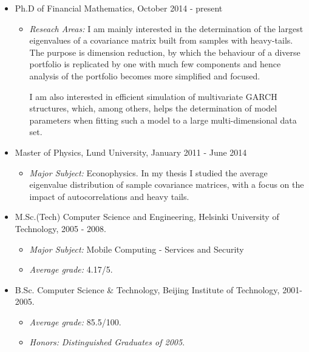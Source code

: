 \documentclass[10pt,letterpaper]{article}
\begin{document}
\begin{itemize}
\item Ph.D of Financial Mathematics, October 2014 - present
  \begin{itemize}
    \item {\it Reseach Areas:} I am mainly interested in the
      determination of the largest eigenvalues of a covariance matrix
      built from samples with heavy-tails. The purpose is dimension
      reduction, by which the behaviour of a diverse portfolio is
      replicated by one with much few components and hence analysis of
      the portfolio becomes more simplified and focused.

      I am also interested in efficient simulation of multivariate
      GARCH structures, which, among others, helps the determination of
      model parameters when fitting such a model to a large
      multi-dimensional data set.
  \end{itemize}  

\item Master of Physics, Lund University, January 2011 - June 2014
  \begin{itemize}
  \item {\it Major Subject:} Econophysics. In my thesis I studied the
    average eigenvalue distribution of sample covariance matrices,
    with a focus on the impact of autocorrelations and heavy tails.


  \end{itemize}

\item M.Sc.(Tech) Computer Science and Engineering, Helsinki
  University of Technology, 2005 - 2008.
  \begin{itemize}
  \item {\it Major Subject:} Mobile Computing - Services and Security
  \item {\it Average grade:} 4.17/5.
  \end{itemize}

\item B.Sc. Computer Science \& Technology, Beijing Institute of
  Technology, 2001- 2005.
  \begin{itemize}
  \item {\it Average grade:} 85.5/100.
  \item {\it Honors:} \textit{Distinguished Graduates of 2005}.
  \end{itemize}
\end{itemize}
\end{document}
